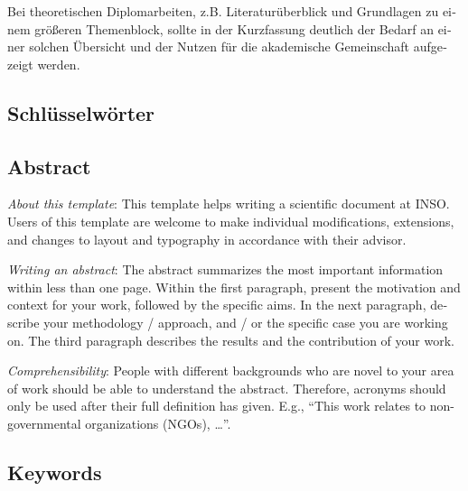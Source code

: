 \begin{otherlanguage}{ngerman}
	\makeatletter\ifthesis@masterthesis
	Bei theoretischen Diplomarbeiten, z.B. Literaturüberblick und Grundlagen zu einem größeren Themenblock, sollte in der Kurzfassung deutlich der Bedarf an einer solchen Übersicht und der Nutzen für die akademische Gemeinschaft aufgezeigt werden.
	\fi\makeatother

  \bigskip

  \section*{Schl\"usselw\"orter}

\end{otherlanguage}


\begin{otherlanguage}{english}

  \chapter*{Abstract}

  \emph{About this template}:
  This template helps writing a scientific document at INSO. Users of this template are welcome to make individual modifications, extensions, and changes to layout and typography in accordance with their advisor.

  \emph{Writing an abstract}:
  The abstract summarizes the most important information within less than one page. Within the first paragraph, present the motivation and context for your work, followed by the specific aims. In the next paragraph, describe your methodology / approach, and / or the specific case you are working on. The third paragraph describes the results and the contribution of your work.

  \emph{Comprehensibility}:
  People with different backgrounds who are novel to your area of work should be able to understand the abstract. Therefore, acronyms should only be used after their full definition has given. E.g., ``This work relates to non-governmental organizations (NGOs), \ldots''.

  \bigskip

  \section*{Keywords}

\end{otherlanguage}
